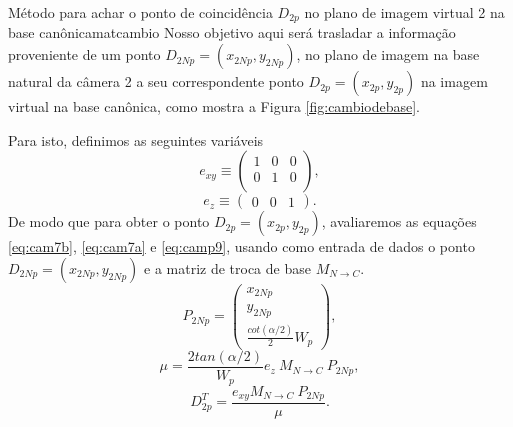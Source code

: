 \documentclass[a4paper,10pt]{article}
\begin{document}
\begin{theoremtcolorbox}{Método para achar o ponto de coincidência $D_{2p}$ no plano de imagem virtual 2 na base canônica}{matcambio}
Nosso objetivo aqui será trasladar a informação proveniente de um ponto 
$D_{2Np}=(x_{2Np},y_{2Np})$, 
no plano de imagem na base natural da câmera 2 a seu correspondente ponto 
$D_{2p}=(x_{2p},y_{2p})$ na imagem virtual na base canônica, como mostra a Figura \ref{fig:cambiodebase}.

Para isto, definimos as seguintes variáveis
\begin{equation}\label{eq:cam8}
 e_{xy} \equiv \left(
 \begin{matrix}
  1&0&0\\
  0&1&0\\
 \end{matrix}
 \right),
\end{equation}
\begin{equation}\label{eq:cam8a}
 e_{z} \equiv \left(  \begin{matrix}
  0&0&1
 \end{matrix} \right).
\end{equation}
De modo que para obter o ponto $D_{2p}=(x_{2p},y_{2p})$, avaliaremos as equações \eqref{eq:cam7b}, \eqref{eq:cam7a} e \eqref{eq:camp9},
usando como entrada de dados o ponto $D_{2Np}=(x_{2Np},y_{2Np})$ e a matriz de troca de base $M_{N \rightarrow C}$.
\begin{equation}\label{eq:cam7b}
 P_{2Np}=\left(
 \begin{matrix}
  x_{2Np}\\
  y_{2Np}\\
  \frac{cot(\alpha/2)}{2}{W_p}
 \end{matrix}
 \right),
\end{equation}
\begin{equation}\label{eq:cam7a}
 \mu = \frac{2 tan(\alpha/2)}{{W_p}} {e_z~M_{N \rightarrow C}~P_{2Np}},
\end{equation}
\begin{equation}\label{eq:camp9}
 D^T_{2p}=\frac{e_{xy} M_{N \rightarrow C}~P_{2Np} }{\mu}.
\end{equation}
\end{theoremtcolorbox}
\end{document}
